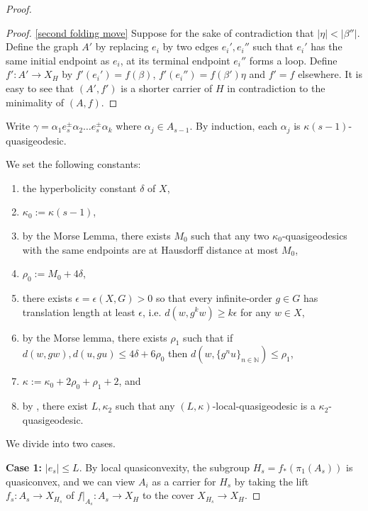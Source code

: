 \documentclass[article, 12pt]{amsart}
\numberwithin{equation}{section}
\theoremstyle{definition}
\begin{document}
\begin{proof}
\begin{proof}
        \ref{second folding move} Suppose for the sake of contradiction that $|\eta|<|\beta''|$.
        Define the graph $A'$ by replacing $e_i$ by two edges $e_i',e_i''$ 
        such that $e_i'$ has the same initial endpoint as $e_i$, at its terminal endpoint $e_i''$ forms a loop. 
        Define $f':A'\to X_H$ by $f'(e_i')=f(\beta)$, $f'(e_i'')=f(\beta')\eta$ and $f'=f$ elsewhere.
        It is easy to see that $(A',f')$ is a shorter carrier of $H$ in contradiction to the minimality of $(A,f)$.
    \end{proof}

    Write $\gamma = \alpha_1e_s^\pm \alpha_2\dots e_s^\pm \alpha_k$ where $\alpha_j\in A_{s-1}$.
    By induction, each $\alpha_j$ is $\kappa(s-1)$-quasigeodesic.

    We set the following constants:
    \begin{enumerate}
    \item the hyperbolicity constant $\delta$ of $X$,
    \item $\kappa_0 := \kappa(s-1)$,
    \item  by the Morse Lemma, there exists $M_0$ such that any two $\kappa_0$-quasigeodesics with the same endpoints are at Hausdorff distance at most $M_0$,
    \item $\rho_0 := M_0+4\delta$,
    \item there exists $\epsilon=\epsilon(X,G)>0$ so that every infinite-order $g\in G$ has translation length at least $\epsilon$, i.e. $d(w,g^kw)\geq k\epsilon$ for any $w\in X$, 
    \item by the Morse lemma, there exists $\rho_1$ such that if $d(w,gw),d(u,gu)\le 4\delta+6\rho_0$ then $d(w,\{g^n u\}_{n\in\mathbb N})\le \rho_1$,
    \item $\kappa :=\kappa_0+2\rho_0+\rho_1+2$, and
    \item by , there exist $L,\kappa_2$ such that any $(L,\kappa)$-local-quasigeodesic is a $\kappa_2$-quasigeodesic.
    \end{enumerate}
    
    We divide into two cases.

    \textbf{Case 1:} $|e_s|\le L$.
    By local quasiconvexity, the subgroup  $H_s = f_*(\pi_1(A_s))$ is quasiconvex, and we can view $A_i$ as a carrier for $H_s$ by taking the lift $f_s:A_s\to X_{H_s}$ of $f|_{A_s}:A_s\to X_H$ to the cover $X_{H_s}\to X_H$. 
    

\end{proof}
\end{document}
